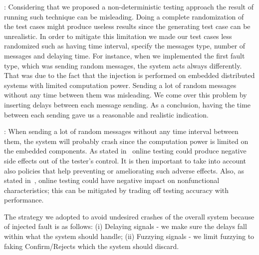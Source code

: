: Considering %
that %
we proposed a non-deterministic testing approach %
the result of running such technique can be misleading. Doing a complete randomization of the test cases might produce useless results since the generating test case can be unrealistic. In order to mitigate this limitation we made our test cases less randomized such as having time interval, specify the messages type, number of messages and delaying time. 
For instance, when we implemented the first fault type, which was sending random messages, the system acts always differently. That was due to the fact that the injection is performed on embedded distributed systems with limited computation power. 
Sending a lot of random messages without any time between them was misleading. We come over this problem by inserting delays between each message sending. As a conclusion, having the time between each sending gave us a reasonable and realistic indication. 

: When sending a lot of random messages without any time interval between them, 
 the system will probably crash since the computation power is limited on the embedded components. As stated in~\cite{Ali2014} online testing 
could produce negative side effects out of the tester's control.
It is then important to take into account also policies that help preventing or ameliorating such adverse
effects. Also, as stated in~\cite{Ali2014}, online testing could have negative impact on nonfunctional characteristics; this can be mitigated by trading off
testing accuracy with performance.

The strategy we adopted to avoid undesired crashes of the overall system because of injected fault is as follows:  
(i) Delaying signals - we make sure the delays fall within what the system should handle; (ii) Fuzzying signals - we limit fuzzying to faking Confirm/Rejects which the system should discard. %





